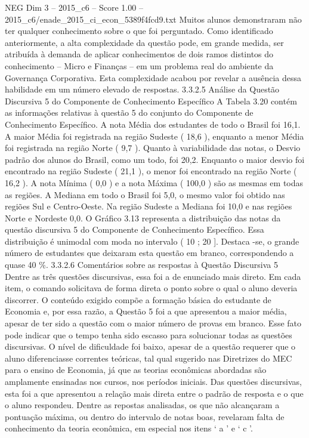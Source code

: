 \begin{textsample}{NEG Dim 3 – 2015\_c6 – Score 1.00 – 2015\_c6/enade\_2015\_ci\_econ\_5389f4fcd9.txt}
Muitos alunos demonstraram não ter qualquer conhecimento sobre o que foi perguntado.
Como identificado anteriormente, a alta complexidade da questão pode, em grande medida, ser atribuída à demanda de aplicar conhecimentos de dois ramos distintos do conhecimento – Micro e Finanças – em um problema real do ambiente da Governança Corporativa.
Esta complexidade acabou por revelar a ausência dessa habilidade em um número elevado de respostas. 3.3.2.5 Análise da Questão Discursiva 5 do Componente de Conhecimento Específico A Tabela 3.20 contém as informações relativas à questão 5 do conjunto do Componente de Conhecimento Específico.
A nota Média dos estudantes de todo o Brasil foi 16,1.
A maior Média foi registrada na região Sudeste ( 18,6 ), enquanto a menor Média foi registrada na região Norte ( 9,7 ).
Quanto à variabilidade das notas, o Desvio padrão dos alunos do Brasil, como um todo, foi 20,2.
Enquanto o maior desvio foi encontrado na região Sudeste ( 21,1 ), o menor foi encontrado na região Norte ( 16,2 ).
A nota Mínima ( 0,0 ) e a nota Máxima ( 100,0 ) são as mesmas em todas as regiões.
A Mediana em todo o Brasil foi 5,0, o mesmo valor foi obtido nas regiões Sul e Centro-Oeste.
Na região Sudeste a Mediana foi 10,0 e nas regiões Norte e Nordeste 0,0.
O Gráfico 3.13 representa a distribuição das notas da questão discursiva 5 do Componente de Conhecimento Específico.
Essa distribuição é unimodal com moda no intervalo ( 10 ; 20 ].
Destaca -se, o grande número de estudantes que deixaram esta questão em branco, correspondendo a quase 40 \%. 3.3.2.6 Comentários sobre as respostas à Questão Discursiva 5 Dentre as três questões discursivas, essa foi a de enunciado mais direto.
Em cada item, o comando solicitava de forma direta o ponto sobre o qual o aluno deveria discorrer.
O conteúdo exigido compõe a formação básica do estudante de Economia e, por essa razão, a Questão 5 foi a que apresentou a maior média, apesar de ter sido a questão com o maior número de provas em branco.
Esse fato pode indicar que o tempo tenha sido escasso para solucionar todas as questões discursivas.
O nível de dificuldade foi baixo, apesar de a questão requerer que o aluno diferenciasse correntes teóricas, tal qual sugerido nas Diretrizes do MEC para o ensino de Economia, já que as teorias econômicas abordadas são amplamente ensinadas nos cursos, nos períodos iniciais.
Das questões discursivas, esta foi a que apresentou a relação mais direta entre o padrão de resposta e o que o aluno respondeu.
Dentre as repostas analisadas, os que não alcançaram a pontuação máxima, ou dentro do intervalo de notas boas, revelaram falta de conhecimento da teoria econômica, em especial nos itens ‘ a ’ e ‘ c ’.

\end{textsample}
